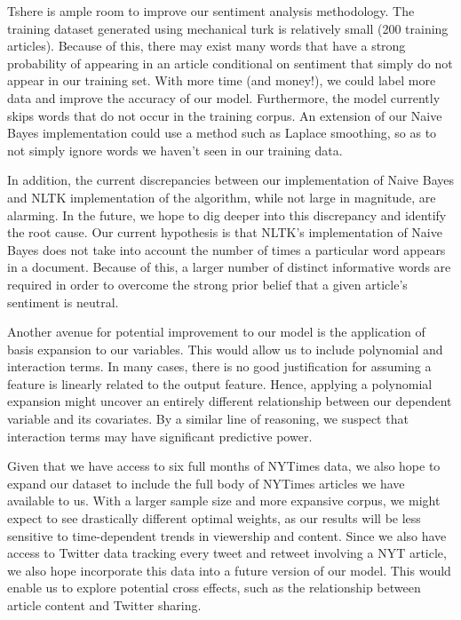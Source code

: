 \documentclass[fleqn,12pt]{SelfArx} %
\begin{document}
Tshere is ample room to improve our sentiment analysis methodology. The training dataset generated using mechanical turk is relatively small (200 training articles). Because of this, there may exist many words that have a strong probability of appearing in an article conditional on sentiment that simply do not appear in our training set. With more time (and money!), we could label more data and improve the accuracy of our model. Furthermore, the model currently skips words that do not occur in the training corpus. An extension of our Naive Bayes implementation could use a method such as Laplace smoothing, so as to not simply ignore words we haven't seen in our training data.

In addition, the current discrepancies between our implementation of Naive Bayes and NLTK implementation of the algorithm, while not large in magnitude, are alarming. In the future, we hope to dig deeper into this discrepancy and identify the root cause. Our current hypothesis is that NLTK's implementation of Naive Bayes does not take into account the number of times a particular word appears in a document. Because of this, a larger number of distinct informative words are required in order to overcome the strong prior belief that a given article's sentiment is neutral.

Another avenue for potential improvement to our model is the application of basis expansion to our variables. This would allow us to include polynomial and interaction terms. In many cases, there is no good justification for assuming a feature is linearly related to the output feature. Hence, applying a polynomial expansion might uncover an entirely different relationship between our dependent variable and its covariates. By a similar line of reasoning, we suspect that interaction terms may have significant predictive power. 

Given that we have access to six full months of NYTimes data, we also hope to expand our dataset to include the full body of NYTimes articles we have available to us. With a larger sample size and more expansive corpus, we might expect to see drastically different optimal weights, as our results will be less sensitive to time-dependent trends in viewership and content. Since we also have access to Twitter data tracking every tweet and retweet involving a NYT article, we also hope incorporate this data into a future version of our model. This would enable us to explore potential cross effects, such as the relationship between article content and Twitter sharing.
\end{document}
